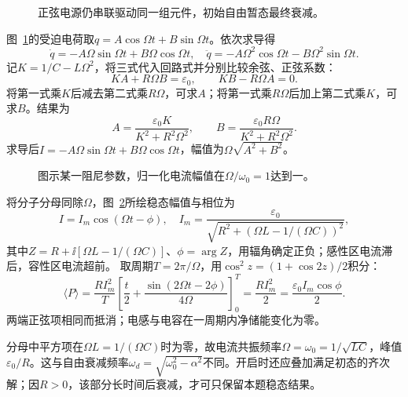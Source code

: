 \begin{figure}[H]\centering
{}
\caption{正弦电源仍串联驱动同一组元件，初始自由暂态最终衰减。}\label{fig:c4-forced-q}
\end{figure}
\begin{solution}
图~\ref{fig:c4-forced-q}的受迫电荷取$q=A\cos\Omega t+B\sin\Omega t$。依次求导得
\[
 \dot q=-A\Omega\sin\Omega t+B\Omega\cos\Omega t,\quad
 \ddot q=-A\Omega^2\cos\Omega t-B\Omega^2\sin\Omega t.
\]
记$K=1/C-L\Omega^2$，将三式代入回路式并分别比较余弦、正弦系数：
\[
 KA+R\Omega B=\varepsilon_0,\qquad KB-R\Omega A=0.
\]
将第一式乘$K$后减去第二式乘$R\Omega$，可求$A$；将第一式乘$R\Omega$后加上第二式乘$K$，可求$B$。结果为
\[
 A=\frac{\varepsilon_0K}{K^2+R^2\Omega^2},\qquad
 B=\frac{\varepsilon_0R\Omega}{K^2+R^2\Omega^2}.
\]
求导后$I=-A\Omega\sin\Omega t+B\Omega\cos\Omega t$，幅值为$\Omega\sqrt{A^2+B^2}$。
\begin{figure}[H]\centering
{}
\caption{图示某一阻尼参数，归一化电流幅值在$\Omega/\omega_0=1$达到一。}\label{fig:c4-forced-s}
\end{figure}
将分子分母同除$\Omega$，图~\ref{fig:c4-forced-s}所绘稳态幅值与相位为
\[
 I=I_m\cos(\Omega t-\phi),\quad
 \boxed{I_m=\frac{\varepsilon_0}{\sqrt{R^2+(\Omega L-1/(\Omega C))^2}}},
\]
其中$Z=R+\ii[\Omega L-1/(\Omega C)]$、$\phi=\arg Z$，用辐角确定正负；感性区电流滞后，容性区电流超前。
取周期$T=2\pi/\Omega$，用$\cos^2z=(1+\cos2z)/2$积分：
\[
 \langle P\rangle=\frac{RI_m^2}{T}
 \left[\frac t2+\frac{\sin(2\Omega t-2\phi)}{4\Omega}\right]_0^T
 =\frac{RI_m^2}{2}=\frac{\varepsilon_0I_m\cos\phi}{2}.
\]
两端正弦项相同而抵消；电感与电容在一周期内净储能变化为零。

分母中平方项在$\Omega L=1/(\Omega C)$时为零，故电流共振频率$\Omega=\omega_0=1/\sqrt{LC}$，峰值$\varepsilon_0/R$。这与自由衰减频率$\omega_d=\sqrt{\omega_0^2-\alpha^2}$不同。开启时还应叠加满足初态的齐次解；因$R>0$，该部分长时间后衰减，才可只保留本题稳态结果。
\end{solution}


